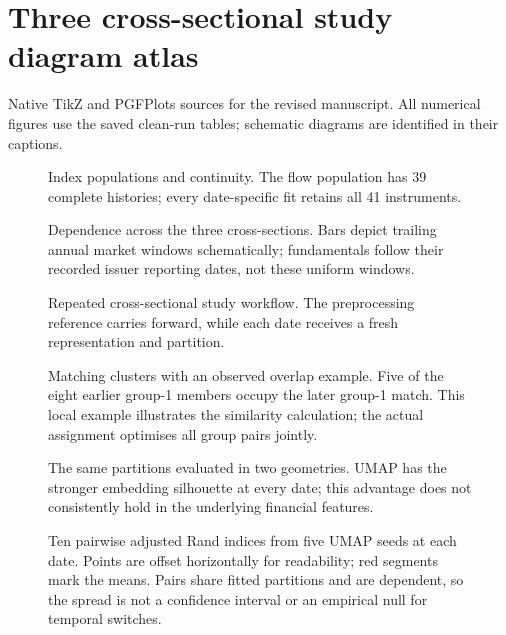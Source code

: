 

\section*{Three cross-sectional study diagram atlas}
Native TikZ and PGFPlots sources for the revised manuscript. All numerical figures use the saved clean-run tables; schematic diagrams are identified in their captions.
\clearpage
\begin{figure}[p]
\centering
{}
\caption{Index populations and continuity. The flow population has 39 complete histories; every date-specific fit retains all 41 instruments.}\end{figure}
\clearpage
\begin{figure}[p]
\centering
{}
\caption{Dependence across the three cross-sections. Bars depict trailing annual market windows schematically; fundamentals follow their recorded issuer reporting dates, not these uniform windows.}\end{figure}
\clearpage
\begin{figure}[p]
\centering
{}
\caption{Repeated cross-sectional study workflow. The preprocessing reference carries forward, while each date receives a fresh representation and partition.}\end{figure}
\clearpage
\begin{figure}[p]
\centering
{}
\caption{Matching clusters with an observed overlap example. Five of the eight earlier group-1 members occupy the later group-1 match. This local example illustrates the similarity calculation; the actual assignment optimises all group pairs jointly.}\end{figure}
\clearpage
\begin{figure}[p]
\centering
{}
\caption{The same partitions evaluated in two geometries. UMAP has the stronger embedding silhouette at every date; this advantage does not consistently hold in the underlying financial features.}\end{figure}
\clearpage
\begin{figure}[p]
\centering
{}
\caption{Ten pairwise adjusted Rand indices from five UMAP seeds at each date. Points are offset horizontally for readability; red segments mark the means. Pairs share fitted partitions and are dependent, so the spread is not a confidence interval or an empirical null for temporal switches.}\end{figure}
